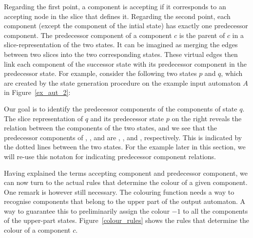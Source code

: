 Regarding the first point, a component is accepting if it corresponds to an accepting node in the slice that defines it. Regarding the second point, each component (except the component of the intial state) has exactly one predecessor component. The predecessor component of a component $c$ is the parent of $c$ in a slice-representation of the two states. It can be imagined as merging the edges between two slices into the two corresponding states. These virtual edges then link each component of the successor state with its predecessor component in the predecessor state. For example, consider the following two states $p$ and $q$, which are created by the state generation procedure on the example input automaton $A$ in Figure~\ref{ex_aut_2}:

\begin{center}
\PredCompsFirst
\end{center}

Our goal is to identify the predecessor components of the components of state $q$. The slice representation of $q$ and its predecessor state $p$ on the right reveals the relation between the components of the two states, and we see that the predecessor components of , , and  are , , and , respectively. This is indicated by the dotted lines between the two states. For the example later in this section, we will re-use this notaton for indicating predecessor component relations.

Having explained the terms accepting component and predecessor component, we can now turn to the actual rules that determine the colour of a given component. One remark is however still necessary. The colouring function needs a way to recognise components that belong to the upper part of the output automaton. A way to guarantee this to preliminarily assign the colour $-1$ to all the components of the upper-part states. Figure~\ref{colour_rules} shows the rules that determine the colour of a component $c$.


